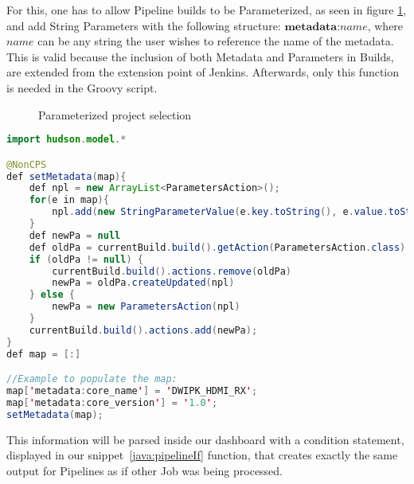 For this, one has to allow Pipeline builds to be Parameterized, as seen in figure \ref{fig:param}, and add String Parameters with the following structure: \(\textbf{metadata:}name\), where \(name\) can be any string the user wishes to reference the name of the metadata. This is valid because the inclusion of both Metadata and Parameters in Builds, are extended from the  extension point of Jenkins.
Afterwards, only this function is needed in the Groovy script.

\begin{figure}[H]
  \centering
      \caption{Parameterized project selection}
      \label{fig:param}
  \end{figure}

\begin{lstlisting}[language=Java, label=groovy:setMetadata, caption=Groovy Script Workaround]
import hudson.model.*

@NonCPS
def setMetadata(map){
    def npl = new ArrayList<ParametersAction>();
    for(e in map){
        npl.add(new StringParameterValue(e.key.toString(), e.value.toString()));
    }
    def newPa = null
    def oldPa = currentBuild.build().getAction(ParametersAction.class)
    if (oldPa != null) {
        currentBuild.build().actions.remove(oldPa)
        newPa = oldPa.createUpdated(npl)
    } else {
        newPa = new ParametersAction(npl)
    }
    currentBuild.build().actions.add(newPa);
}
def map = [:]

//Example to populate the map:
map['metadata:core_name'] = 'DWIPK_HDMI_RX';
map['metadata:core_version'] = '1.0';
setMetadata(map);
\end{lstlisting}

This information will be parsed inside our dashboard with a condition statement, displayed in our snippet~\ref{java:pipelineIf} function, that creates exactly the same output for Pipelines as if other Job was being processed.


